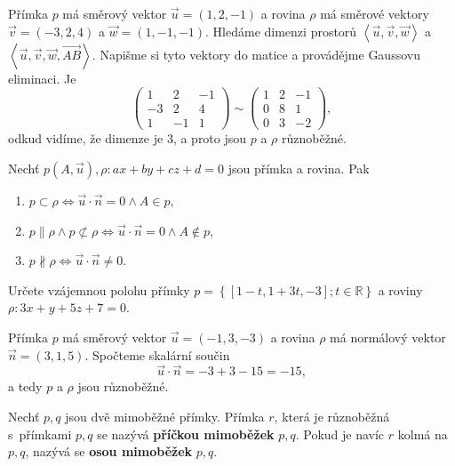 \begin{reseni}
Přímka $p$ má směrový vektor $\vec u = (1,2,-1)$ a rovina $\rho$ má směrové vektory $\vec v=(-3,2,4)$ a
$\vec w = (1,-1,-1)$. Hledáme dimenzi prostorů $\left<  \vec u, \vec v, \vec w \right>$ a
$\left<  \vec u, \vec v, \vec w,  \overrightarrow{AB} \right> .$ Napišme si tyto vektory do matice a provádějme
Gaussovu eliminaci. Je
$$
\begin{pmatrix}
	1 & 2 & -1 \\
	-3 & 2 & 4 \\
	1 & -1 & 1
\end{pmatrix} \sim \begin{pmatrix}
	1 & 2 & -1 \\
	0 & 8 & 1 \\
	0 & 3 & -2
\end{pmatrix},
$$
odkud vidíme, že dimenze je 3, a proto jsou $p$ a $\rho$ různoběžné.
\end{reseni}

\begin{veta}
    Nechť $p(A,\vec u), \rho\colon ax+by+cz+d=0$ jsou přímka a rovina. Pak
    \begin{enumerate}[$i.$]
    \item $p\subset \rho \iff \vec u \cdot \vec n = 0\land A\in p,$
   	\item $p \parallel \rho \land p \not\subset \rho \iff \vec u\cdot \vec n = 0\land A\notin p,$
   	\item $p \nparallel \rho \iff \vec u\cdot \vec n\ne 0$.
    \end{enumerate}
\end{veta}

\begin{priklad}
Určete vzájemnou polohu přímky $p=\left \{ [1-t,1+3t,-3]; t \in \mathbb R \right \} $ a
roviny $\rho\colon 3x+y+5z+7=0.$
\end{priklad}

\begin{reseni}
Přímka $p$ má směrový vektor $\vec u= (-1,3,-3)$ a rovina $\rho$ má normálový vektor $\vec n=(3,1,5)$.
Spočteme skalární součin
$$
    \vec u \cdot \vec n = -3+3-15 = -15,
$$
a tedy $p$ a $\rho$ jsou různoběžné.
\end{reseni}

\begin{definition}
Nechť $p,q$ jsou dvě mimoběžné přímky. Přímka $r$, která je různoběžná s~přímkami
$p,q$ se nazývá \textbf{příčkou mimoběžek} $p,q$. Pokud je navíc $r$ kolmá na $p,q$,
nazývá se \textbf{osou mimoběžek} $p,q$.
\end{definition}

